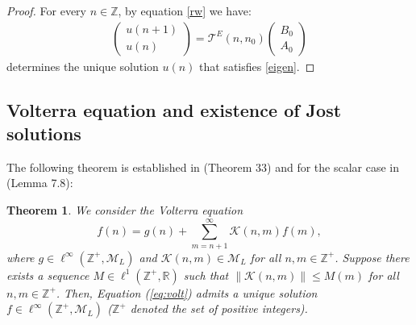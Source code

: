 \documentclass[12pt,oneside,onecolumn,open]{article}
\newtheorem{teo}{Theorem}[section]
\begin{document}
\begin{proof}
   For every $n\in \mathbb{Z}$, by equation \eqref{rw} we have:
 \begin{align}
    \begin{pmatrix}
        u(n+1)\\
        u(n)
    \end{pmatrix}=\mathcal{T}^{E}(n,n_0)
     \begin{pmatrix}
        B_0\\
        A_0
    \end{pmatrix}
\end{align}
determines the unique solution  $u(n)$ that satisfies   \eqref{eigen}.
\end{proof}




 
\color{black}












\color{cyan}

\color{black}

    





\subsection{Volterra equation and existence of Jost solutions}\label{sectionVE}

 The following theorem is established in \cite{MR4385984} (Theorem 33) and for the scalar case in \cite{MR1711536} (Lemma 7.8):
\begin{teo}\label{teo:volt}
We consider the Volterra equation
\begin{equation}
\label{eq:volt}
f(n) = g(n) + \sum_{m=n+1}^{\infty} \mathcal{K}(n,m)f(m),
\end{equation}
where \(g \in \ell^{\infty}(\mathbb{Z}^{+}, \mathcal{M}_{L})\) and \(\mathcal{K}(n,m) \in \mathcal{M}_L\) for all \(n, m \in \mathbb{Z}^{+}\). Suppose there exists a sequence \(M \in \ell^{1}(\mathbb{Z}^{+}, \mathbb{R})\) such that \(\|\mathcal{K}(n,m)\| \leq M(m)\) for all \(n, m \in \mathbb{Z}^{+}\). Then, Equation (\ref{eq:volt}) admits a unique solution \(f \in \ell^{\infty}(\mathbb{Z}^{+}, \mathcal{M}_{L})\) ($\mathbb{Z}^{+}$ denoted the set of positive integers). 
\end{teo}
\end{document}
